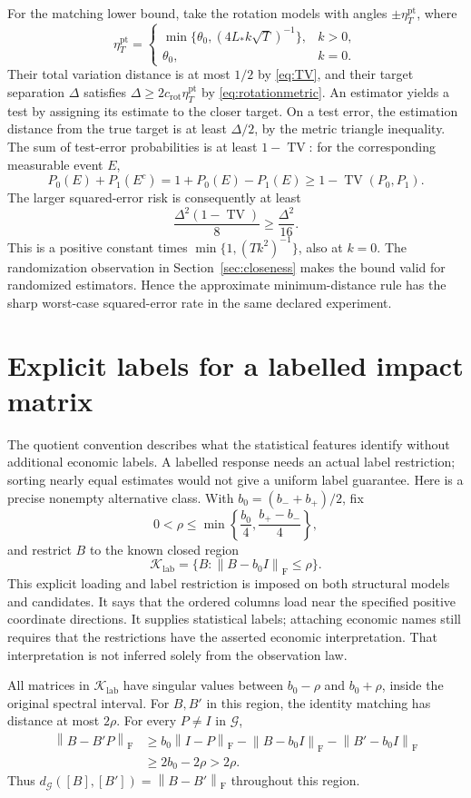 \documentclass[11pt,a4paper]{article}
\numberwithin{equation}{section}
\newcommand{\cG}{\mathcal G}
\newcommand{\F}{\mathrm F}
\newcommand{\norm}[1]{\left\lVert #1\right\rVert}
\DeclareMathOperator{\TV}{TV}
\begin{document}
For the matching lower bound, take the rotation models with angles
\(\pm\eta_T^{\mathrm{pt}}\), where
\[
 \eta_T^{\mathrm{pt}}=
 \begin{cases}
  \min\{\theta_0,(4L_*k\sqrt T)^{-1}\},&k>0,\\
  \theta_0,&k=0.
 \end{cases}
\]
Their total variation distance is at most \(1/2\) by \eqref{eq:TV},
and their target separation \(\Delta\) satisfies
\(\Delta\ge2c_{\mathrm{rot}}\eta_T^{\mathrm{pt}}\)
by \eqref{eq:rotationmetric}.
An estimator yields a test by assigning its estimate to the closer
target. On a test error, the estimation distance from the true target
is at least \(\Delta/2\), by the metric triangle inequality.
The sum of test-error probabilities is at least \(1-\TV\):
for the corresponding measurable event \(E\),
\[
 P_0(E)+P_1(E^c)
 =1+P_0(E)-P_1(E)\ge1-\TV(P_0,P_1).
\]
The larger squared-error risk is consequently at least
\[
 \frac{\Delta^2(1-\TV)}8\ge\frac{\Delta^2}{16}.
\]
This is a positive constant times
\(\min\{1,(Tk^2)^{-1}\}\), also at \(k=0\).
The randomization observation in Section~\ref{sec:closeness} makes the
bound valid for randomized estimators.
Hence the approximate minimum-distance rule has the sharp worst-case
squared-error rate in the same declared experiment.

\section{Explicit labels for a labelled impact matrix}\label{sec:labels}
The quotient convention describes what the statistical features identify
without additional economic labels. A labelled response needs an actual
label restriction; sorting nearly equal estimates would not give a
uniform label guarantee.
Here is a precise nonempty alternative class.
With \(b_0=(b_-+b_+)/2\), fix
\[
 0<\rho\le\min\left\{\frac{b_0}{4},\frac{b_+-b_-}{4}\right\},
\]
and restrict \(B\) to the known closed region
\[
 \mathcal K_{\mathrm{lab}}
 =\{B:\norm{B-b_0I}_{\F}\le\rho\}.
\]
This explicit loading and label restriction is imposed on both structural
models and candidates. It says that the ordered columns load near the
specified positive coordinate directions. It supplies statistical labels;
attaching economic names still requires that the restrictions have the
asserted economic interpretation. That interpretation is not inferred
solely from the observation law.

All matrices in \(\mathcal K_{\mathrm{lab}}\) have singular values between
\(b_0-\rho\) and \(b_0+\rho\), inside the original spectral interval.
For \(B,B'\) in this region, the identity matching has distance at most
\(2\rho\). For every \(P\ne I\) in \(\cG\),
\begin{align*}
 \norm{B-B'P}_{\F}
 &\ge b_0\norm{I-P}_{\F}
       -\norm{B-b_0I}_{\F}-\norm{B'-b_0I}_{\F}\\
 &\ge2b_0-2\rho>2\rho.
\end{align*}
Thus \(d_{\cG}([B],[B'])=\norm{B-B'}_{\F}\) throughout this region.
\end{document}
